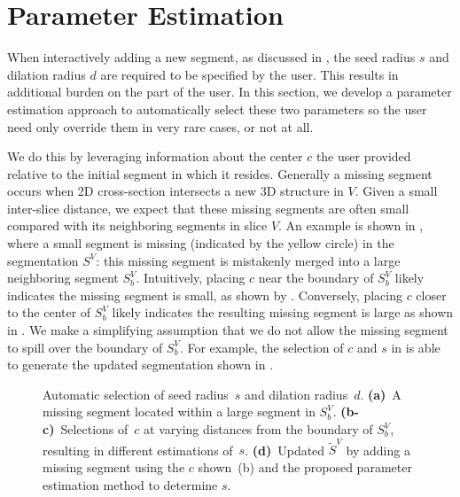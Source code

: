 \documentclass[]{spie}  %
\begin{document}
\section{Parameter Estimation}
\label{sec:param}

When interactively adding a new segment, as discussed in
, the seed radius $s$ and dilation radius $d$ are
required to be specified by the user.  This results in additional
burden on the part of the user.  In this section, we develop a
parameter estimation approach to automatically select these two
parameters so the user need only override them in very rare cases, or
not at all.

We do this by leveraging information about the center $c$ the user
provided relative to the initial segment in which it resides.
Generally a missing segment occurs when 2D cross-section intersects a
new 3D structure in $V$.  Given a small inter-slice distance, we
expect that these missing segments are often small compared with its
neighboring segments in slice $V$.  An example is shown in
, where a small segment is missing (indicated by the
yellow circle) in the segmentation $S^V$: this missing segment is
mistakenly merged into a large neighboring segment $S^V_b$.
Intuitively, placing $c$ near the boundary of $S^V_b$ likely indicates
the missing segment is small, as shown by .
Conversely, placing $c$ closer to the center of $S^V_b$ likely
indicates the resulting missing segment is large as shown in
.  We make a simplifying assumption that we do not
allow the missing segment to spill over the boundary of $S^V_b$.  For
example, the selection of $c$ and $s$ in  is able to
generate the updated segmentation shown in .
\begin{figure}[htbp]
\centering
{}
\hspace{0.1em}

\hspace{0.1em}
\caption{Automatic selection of seed radius~$s$ and dilation
  radius~$d$.  \textbf{(a)}~A missing segment located within a large
  segment in $S^V_b$.  \textbf{(b-c)}~Selections of~$c$ at varying
  distances from the boundary of $S^V_b$, resulting in different
  estimations of~$s$.  \textbf{(d)}~Updated $\tilde{S}^V$ by adding
  a missing segment using the $c$ shown~(b) and the proposed parameter
  estimation method to determine $s$.} \label{fig:param}
\end{figure}
\end{document}
